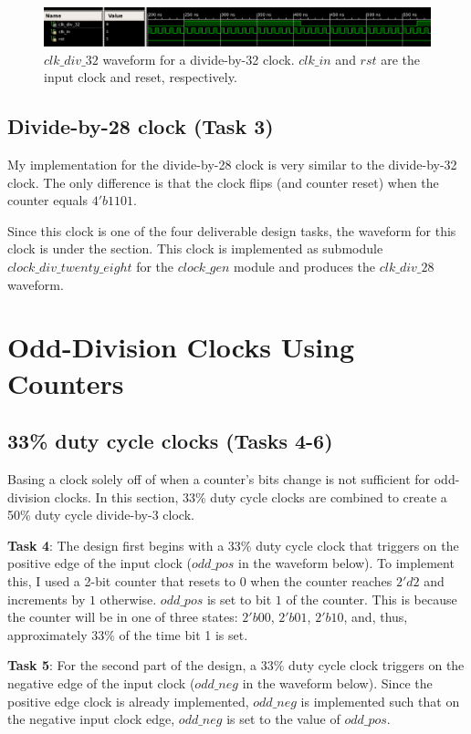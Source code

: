 \documentclass{article}
\begin{document}
\begin{figure}[H]
    \centering
    \includegraphics[scale=0.44]{../figs/clock_32.png}
    \caption{$clk\_div\_32$ waveform for a divide-by-32 clock. $clk\_in$ and $rst$ are the input clock and reset, respectively.}
    \label{fig:clk100_200_zoomedout}
\end{figure}

\subsection{Divide-by-28 clock (Task 3)}\label{sec:clk28}
My implementation for the divide-by-28 clock is very similar to the divide-by-32 clock. The only difference is that the clock flips (and counter reset) when the counter equals $4'b1101$.

Since this clock is one of the four deliverable design tasks, the waveform for this clock is under the  section. This clock is implemented as submodule $clock\_div\_twenty\_eight$ for the $clock\_gen$ module and produces the $clk\_div\_28$ waveform.

\section{Odd-Division Clocks Using Counters}
\subsection{33\% duty cycle clocks (Tasks 4-6)}
Basing a clock solely off of when a counter's bits change is not sufficient for odd-division clocks. In this section, 33\% duty cycle clocks are combined to create a 50\% duty cycle divide-by-3 clock.

\textbf{Task 4}: The design first begins with a 33\% duty cycle clock that triggers on the positive edge of the input clock ($odd\_pos$ in the waveform below). To implement this, I used a 2-bit counter that resets to $0$ when the counter reaches $2'd2$ and increments by $1$ otherwise. $odd\_pos$ is set to bit $1$ of the counter. This is because the counter will be in one of three states: $2'b00$, $2'b01$, $2'b10$, and, thus, approximately 33\% of the time bit 1 is set.

\textbf{Task 5}: For the second part of the design, a 33\% duty cycle clock triggers on the negative edge of the input clock ($odd\_neg$ in the waveform below). Since the positive edge clock is already implemented, $odd\_neg$ is implemented such that on the negative input clock edge, $odd\_neg$ is set to the value of $odd\_pos$.
\end{document}
